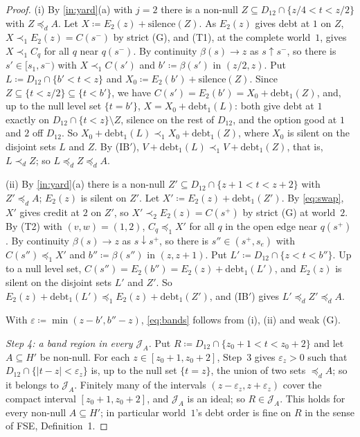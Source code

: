 \documentclass[11pt]{article}
\theoremstyle{definition}\newtheorem{definition}[theorem]{Definition}
\theoremstyle{remark}\newtheorem{remark}[theorem]{Remark}
\newcommand{\debt}{\mathrm{debt}}
\newcommand{\sil}{\mathrm{silence}}
\newcommand{\Jid}{\mathcal J}
\begin{document}
\begin{proof}
(i) By \ref{in:yard}(a) with $j=2$ there is a non-null
$Z\subseteq D_{12}\cap\{z/4<t<z/2\}$ with $Z\preceq_dA$. Let
$X\coloneqq E_2(z)+\sil(Z)$. As $E_2(z)$ gives debt at $1$ on $Z$,
$X\prec_1E_2(z)=C(s^-)$ by strict (G), and (T1), at the complete
world~$1$, gives $X\prec_1C_q$ for all $q$ near $q(s^-)$. By continuity $\beta(s)\to z$ as $s\uparrow s^-$, so
there is $s'\in[s_1,s^-)$ with $X\prec_1C(s')$ and $b'\coloneqq\beta(s')$
in $(z/2,z)$. Put $L\coloneqq D_{12}\cap\{b'<t<z\}$ and
$X_0\coloneqq E_2(b')+\sil(Z)$. Since $Z\subseteq\{t<z/2\}\subseteq\{t<b'\}$,
we have $C(s')=E_2(b')=X_0+\debt_1(Z)$, and, up to the null level set
$\{t=b'\}$, $X=X_0+\debt_1(L)$: both give debt at $1$ exactly on
$D_{12}\cap\{t<z\}\setminus Z$, silence on the rest of $D_{12}$, and the
option good at $1$ and $2$ off $D_{12}$. So
$X_0+\debt_1(L)\prec_1X_0+\debt_1(Z)$, where $X_0$ is silent on the disjoint
sets $L$ and $Z$. By (IB$'$), $V+\debt_1(L)\prec_1V+\debt_1(Z)$, that is,
$L\prec_dZ$; so $L\preceq_dZ\preceq_dA$.

(ii) By \ref{in:yard}(a) there is a non-null
$Z'\subseteq D_{12}\cap\{z+1<t<z+2\}$ with $Z'\preceq_dA$; $E_2(z)$ is silent
on $Z'$. Let $X'\coloneqq E_2(z)+\debt_1(Z')$. By \eqref{eq:swap}, $X'$
gives credit at $2$ on $Z'$, so $X'\prec_2E_2(z)=C(s^+)$ by strict (G) at
world~$2$. By (T2) with $(v,w)=(1,2)$, $C_q\preceq_1X'$ for all $q$ in the
open edge near $q(s^+)$. By continuity $\beta(s)\to z$ as $s\downarrow s^+$,
so there is $s''\in(s^+,s_e)$ with $C(s'')\preceq_1X'$ and
$b''\coloneqq\beta(s'')$ in $(z,z+1)$. Put
$L'\coloneqq D_{12}\cap\{z<t<b''\}$. Up to a null level set,
$C(s'')=E_2(b'')=E_2(z)+\debt_1(L')$, and $E_2(z)$ is silent on the
disjoint sets $L'$ and $Z'$. So $E_2(z)+\debt_1(L')\preceq_1
E_2(z)+\debt_1(Z')$, and (IB$'$) gives $L'\preceq_dZ'\preceq_dA$.

With $\varepsilon\coloneqq\min(z-b',b''-z)$, \eqref{eq:bands} follows from
(i), (ii) and weak (G).

\emph{Step 4: a band region in every $\Jid_A$.} Put
$R\coloneqq D_{12}\cap\{z_0+1<t<z_0+2\}$ and let $A\subseteq H'$ be
non-null. For each $z\in[z_0+1,z_0+2]$, Step~3 gives $\varepsilon_z>0$ such that
$D_{12}\cap\{|t-z|<\varepsilon_z\}$ is, up to the null set $\{t=z\}$, the
union of two sets $\preceq_dA$; so it belongs to $\Jid_A$. Finitely many of
the intervals $(z-\varepsilon_z,z+\varepsilon_z)$ cover the compact interval
$[z_0+1,z_0+2]$, and $\Jid_A$ is an ideal; so $R\in\Jid_A$. This holds for every
non-null $A\subseteq H'$; in particular world~$1$'s debt order is fine on
$R$ in the sense of FSE, Definition~1.


\end{proof}
\end{document}
